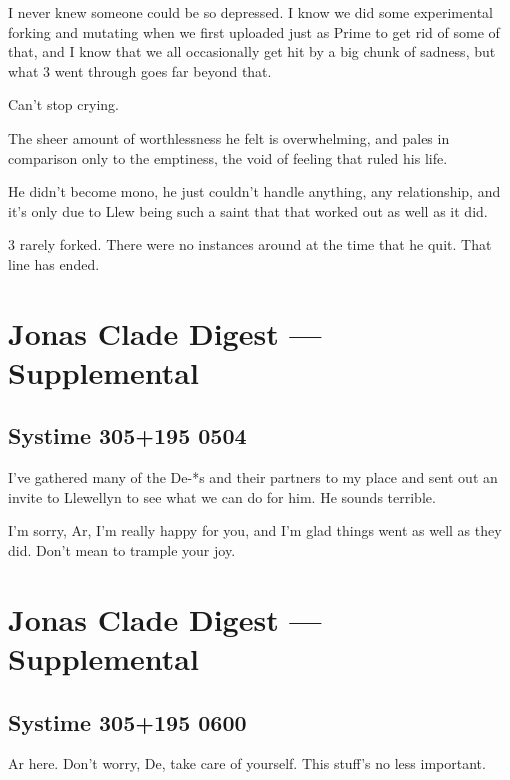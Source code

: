 I never knew someone could be so depressed. I know we did some experimental forking and mutating when we first uploaded just as Prime to get rid of some of that, and I know that we all occasionally get hit by a big chunk of sadness, but what 3 went through goes far beyond that.

Can't stop crying.

The sheer amount of worthlessness he felt is overwhelming, and pales in comparison only to the emptiness, the void of feeling that ruled his life.

He didn't become mono, he just couldn't handle anything, any relationship, and it's only due to Llew being such a saint that that worked out as well as it did.

3 rarely forked. There were no instances around at the time that he quit. That line has ended.

\newpage
\hypertarget{jonas-clade-digest-supplemental-4}{%
\section*{Jonas Clade Digest --- Supplemental}\label{jonas-clade-digest-supplemental-4}}

\hypertarget{systime-305195-0504}{%
\subsection*{Systime 305+195 0504}\label{systime-305195-0504}}

I've gathered many of the De-*s and their partners to my place and sent out an invite to Llewellyn to see what we can do for him. He sounds terrible.

I'm sorry, Ar, I'm really happy for you, and I'm glad things went as well as they did. Don't mean to trample your joy.

\newpage
\hypertarget{jonas-clade-digest-supplemental-5}{%
\section*{Jonas Clade Digest --- Supplemental}\label{jonas-clade-digest-supplemental-5}}

\hypertarget{systime-305195-0600}{%
\subsection*{Systime 305+195 0600}\label{systime-305195-0600}}

Ar here. Don't worry, De, take care of yourself. This stuff's no less important.

